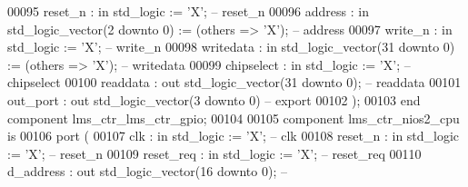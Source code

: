 \begin{DoxyCode}
00095             reset\_n    : \textcolor{keywordflow}{in}  \textcolor{comment}{std\_logic}                     := 'X';             \textcolor{keyword}{-- reset\_n}
00096             address    : \textcolor{keywordflow}{in}  \textcolor{comment}{std\_logic\_vector}(\textcolor{vhdllogic}{}\textcolor{vhdllogic}{2} \textcolor{keywordflow}{downto} \textcolor{vhdllogic}{}\textcolor{vhdllogic}{0})  := (\textcolor{keywordflow}{others} => 'X'); \textcolor{keyword}{-- address}
00097             write\_n    : \textcolor{keywordflow}{in}  \textcolor{comment}{std\_logic}                     := 'X';             \textcolor{keyword}{-- write\_n}
00098             writedata  : \textcolor{keywordflow}{in}  \textcolor{comment}{std\_logic\_vector}(\textcolor{vhdllogic}{}\textcolor{vhdllogic}{31} \textcolor{keywordflow}{downto} \textcolor{vhdllogic}{}\textcolor{vhdllogic}{0}) := (\textcolor{keywordflow}{others} => 'X'); \textcolor{keyword}{-- writedata}
00099             chipselect : \textcolor{keywordflow}{in}  \textcolor{comment}{std\_logic}                     := 'X';             \textcolor{keyword}{-- chipselect}
00100             readdata   : \textcolor{keywordflow}{out} \textcolor{comment}{std\_logic\_vector}(\textcolor{vhdllogic}{}\textcolor{vhdllogic}{31} \textcolor{keywordflow}{downto} \textcolor{vhdllogic}{}\textcolor{vhdllogic}{0});                    \textcolor{keyword}{-- readdata}
00101             out\_port   : \textcolor{keywordflow}{out} \textcolor{comment}{std\_logic\_vector}(\textcolor{vhdllogic}{}\textcolor{vhdllogic}{3} \textcolor{keywordflow}{downto} \textcolor{vhdllogic}{}\textcolor{vhdllogic}{0})\textcolor{keyword}{                      -- export}
00102         );
00103     \textcolor{keywordflow}{end} \textcolor{keywordflow}{component} \textcolor{vhdlchar}{lms_ctr_lms_ctr_gpio};
00104 
00105     \textcolor{keywordflow}{component} lms\_ctr\_nios2\_cpu \textcolor{keywordflow}{is}
00106         \textcolor{keywordflow}{port} (
00107             clk                                 : \textcolor{keywordflow}{in}  \textcolor{comment}{std\_logic}                     := 'X';             \textcolor{keyword}{--
       clk}
00108             reset\_n                             : \textcolor{keywordflow}{in}  \textcolor{comment}{std\_logic}                     := 'X';             \textcolor{keyword}{--
       reset\_n}
00109             reset\_req                           : \textcolor{keywordflow}{in}  \textcolor{comment}{std\_logic}                     := 'X';             \textcolor{keyword}{--
       reset\_req}
00110             d\_address                           : \textcolor{keywordflow}{out} \textcolor{comment}{std\_logic\_vector}(\textcolor{vhdllogic}{}\textcolor{vhdllogic}{16} \textcolor{keywordflow}{downto} \textcolor{vhdllogic}{}\textcolor{vhdllogic}{0});                    \textcolor{keyword}{--
}
\end{DoxyCode}
